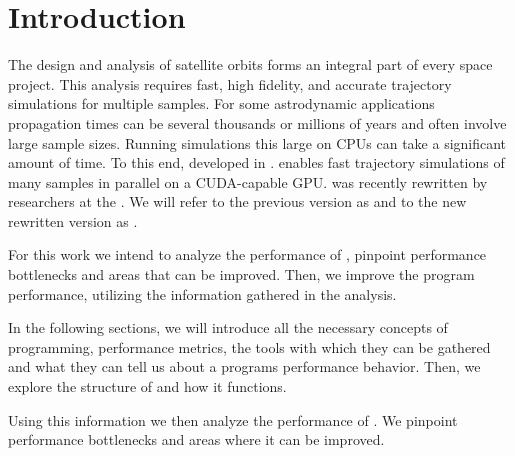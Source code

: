 \chapter{Introduction}
The design and analysis of satellite orbits forms an integral part of every space project.
This analysis requires fast, high fidelity, and accurate trajectory simulations for multiple samples.
For some astrodynamic applications propagation times can be several thousands or millions of years and often involve large sample sizes.
Running simulations this large on CPUs can take a significant amount of time.
To this end, \citeauthor{geda_massive_2019} developed \cudaj in \citeyear{geda_massive_2019}\cite{geda_massive_2019}.
\cudaj enables fast trajectory simulations of many samples in parallel on a CUDA-capable GPU.
\cudaj was recently rewritten by researchers at the \esoc.
We will refer to the previous version as  and to the new rewritten version as .

For this work we intend to analyze the performance of , pinpoint performance bottlenecks and areas that can be improved.
Then, we improve the program performance, utilizing the information gathered in the analysis.

In the following sections, we will introduce all the necessary concepts of \cuda programming, performance metrics, the tools with which they can be gathered and what they can tell us about a programs performance behavior.
Then, we explore the structure of  and how it functions.

Using this information we then analyze the performance of .
We pinpoint performance bottlenecks and areas where it can be improved.

